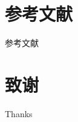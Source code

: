 \documentclass[11pt, aspectratio=169, UTF8, fontset=none]{ctexbeamer}
\begin{document}
\section*{参考文献}
\begin{frame}[allowframebreaks]{参考文献}
    \printbibliography
\end{frame}

\section*{致谢}
\begin{frame}
    \begin{center}
        {\Huge Thanks} \\
    \end{center}
\end{frame}
\end{document}
